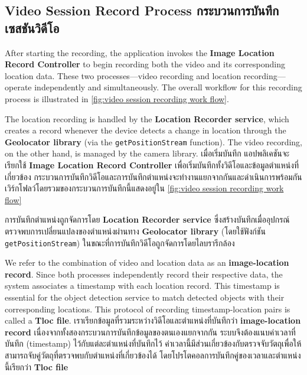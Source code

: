 \subsection{\ifenglish Video Session Record Process \else กระบวนการบันทึกเซสชันวิดีโอ \fi}

\ifenglish
After starting the recording, the application invokes the \textbf{Image Location Record Controller} to begin recording both the video and its corresponding location data. These two processes—video recording and location recording—operate independently and simultaneously. The overall workflow for this recording process is illustrated in \autoref{fig:video session recording work flow}. 

The location recording is handled by the \textbf{Location Recorder service}, which creates a record whenever the device detects a change in location through the \textbf{Geolocator library} (via the \texttt{getPositionStream} function). The video recording, on the other hand, is managed by the camera library.
\else
เมื่อเริ่มบันทึก แอปพลิเคชันจะเรียกใช้ \textbf{Image Location Record Controller} เพื่อเริ่มบันทึกทั้งวิดีโอและข้อมูลตำแหน่งที่เกี่ยวข้อง กระบวนการบันทึกวิดีโอและการบันทึกตำแหน่งจะทำงานแยกจากกันและดำเนินการพร้อมกัน เวิร์กโฟลว์โดยรวมของกระบวนการบันทึกนี้แสดงอยู่ใน \autoref{fig:video session recording work flow} 

การบันทึกตำแหน่งถูกจัดการโดย \textbf{Location Recorder service} ซึ่งสร้างบันทึกเมื่ออุปกรณ์ตรวจพบการเปลี่ยนแปลงของตำแหน่งผ่านทาง \textbf{Geolocator library} (โดยใช้ฟังก์ชัน \texttt{getPositionStream}) ในขณะที่การบันทึกวิดีโอถูกจัดการโดยไลบรารีกล้อง
\fi

\ifenglish
We refer to the combination of video and location data as an \textbf{image-location record}. Since both processes independently record their respective data, the system associates a timestamp with each location record. This timestamp is essential for the object detection service to match detected objects with their corresponding locations. This protocol of recording timestamp-location pairs is called a \textbf{Tloc file}.
\else
เราเรียกข้อมูลที่รวมระหว่างวิดีโอและตำแหน่งที่บันทึกว่า \textbf{image-location record} เนื่องจากทั้งสองกระบวนการบันทึกข้อมูลของตนเองแยกจากกัน ระบบจึงต้องแนบค่าเวลาที่บันทึก (timestamp) ไว้กับแต่ละตำแหน่งที่บันทึกไว้ ค่าเวลานี้มีส่วนเกี่ยวข้องกับตรวจจับวัตถุเพื่อให้สามารถจับคู่วัตถุที่ตรวจพบกับตำแหน่งที่เกี่ยวข้องได้ โดยโปรโตคอลการบันทึกคู่ของเวลาและตำแหน่งนี้เรียกว่า \textbf{Tloc file}
\fi

